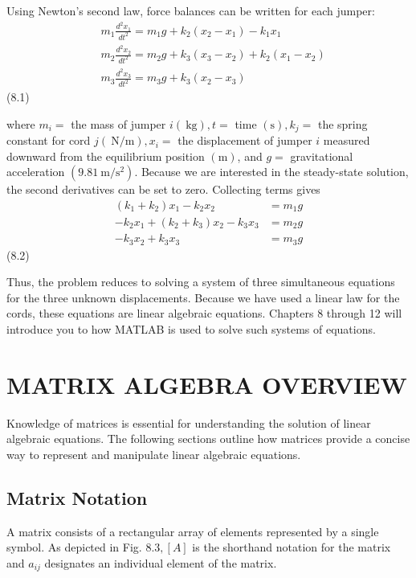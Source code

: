 \documentclass[../main.tex]{subfiles}
\begin{document}
Using Newton's second law, force balances can be written for each jumper:
$$
\begin{aligned}
&m_{1} \frac{d^{2} x_{1}}{d t^{2}}=m_{1} g+k_{2}\left(x_{2}-x_{1}\right)-k_{1} x_{1} \\
&m_{2} \frac{d^{2} x_{2}}{d t^{2}}=m_{2} g+k_{3}\left(x_{3}-x_{2}\right)+k_{2}\left(x_{1}-x_{2}\right) \\
&m_{3} \frac{d^{2} x_{3}}{d t^{2}}=m_{3} g+k_{3}\left(x_{2}-x_{3}\right)
\end{aligned}
$$ \hfill{(8.1)}

where $m_{i}=$ the mass of jumper $i(\mathrm{~kg}), t=$ time $(\mathrm{s}), k_{j}=$ the spring constant for cord $j(\mathrm{~N} / \mathrm{m}), x_{i}=$ the displacement of jumper $i$ measured downward from the equilibrium position $(\mathrm{m})$, and $g=$ gravitational acceleration $\left(9.81 \mathrm{~m} / \mathrm{s}^{2}\right)$. Because we are interested in the steady-state solution, the second derivatives can be set to zero. Collecting terms gives
$$
\begin{aligned}
\left(k_{1}+k_{2}\right) x_{1}-k_{2} x_{2} &=m_{1} g \\
-k_{2} x_{1}+\left(k_{2}+k_{3}\right) x_{2}-k_{3} x_{3} &=m_{2} g \\
-k_{3} x_{2}+k_{3} x_{3} &=m_{3} g
\end{aligned}
$$ \hfill{(8.2)}

Thus, the problem reduces to solving a system of three simultaneous equations for the three unknown displacements. Because we have used a linear law for the cords, these equations are linear algebraic equations. Chapters 8 through 12 will introduce you to how MATLAB is used to solve such systems of equations.

\bigskip
\section{MATRIX ALGEBRA OVERVIEW}
\label{sec:sec_8_1}

Knowledge of matrices is essential for understanding the solution of linear algebraic equations. The following sections outline how matrices provide a concise way to represent and manipulate linear algebraic equations.

\subsection{Matrix Notation}

\noindent A matrix consists of a rectangular array of elements represented by a single symbol. As depicted in Fig. $8.3,[A]$ is the shorthand notation for the matrix and $a_{i j}$ designates an individual element of the matrix.
\end{document}

